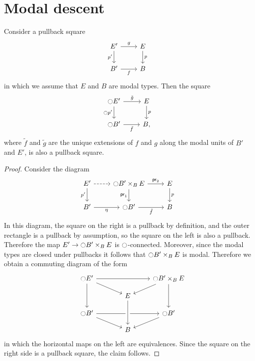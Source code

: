 \documentclass[9pt,twosided]{amsart}
\begin{document}
\section{Modal descent}\label{section:modal-descent}

\begin{prp}\label{thm:etale_flattening}
Consider a pullback square
\begin{equation*}
\begin{tikzcd}
E' \arrow[d,swap,"{p'}"] \arrow[r,"g"] & E \arrow[d,"p"] \\
B' \arrow[r,swap,"f"] & B
\end{tikzcd}
\end{equation*}
in which we assume that $E$ and $B$ are modal types. Then the square
  \begin{equation*}
    \begin{tikzcd}
      \modal E' \arrow[r,"\tilde{g}"] \arrow[d,swap,"{\modal p'}"] & E \arrow[d,"p"] \\
      \modal B' \arrow[r,swap,"\tilde{f}"] & B,
    \end{tikzcd}
  \end{equation*}
  where $\tilde{f}$ and $\tilde{g}$ are the unique extensions of $f$ and $g$ along the modal units of $B'$ and $E'$, is also a pullback square.
\end{prp}

\begin{proof}
Consider the diagram
\begin{equation*}
\begin{tikzcd}
E' \arrow[r,dashed] \arrow[d,swap,"{p'}"] & \modal B'\times_{B} E \arrow[r,"\proj 2"] \arrow[d,swap,"\proj 1"] & E \arrow[d,"p"] \\
B' \arrow[r,swap,"\modalunit"] & \modal B' \arrow[r,swap,"\tilde{f}"] & B
\end{tikzcd}
\end{equation*}
In this diagram, the square on the right is a pullback by definition, and the outer rectangle is a pullback by assumption, so the square on the left is also a pullback. Therefore the map $E'\to {\ensuremath{\ocircle}} B'\times_B E$ is ${\ocircle}$-connected. Moreover, since the modal types are closed under pullbacks it follows that ${\ocircle} B'\times_B E$ is modal. Therefore we obtain a commuting diagram of the form
\begin{equation*}
  \begin{tikzcd}[row sep=small]
    \modal E' \arrow[dd] \arrow[rr] \arrow[dr] & & \modal B'\times_B E \arrow[dd] \arrow[dl] \\
    \phantom{\modal B'\times_B E} & E \\
    \modal B' \arrow[rr] \arrow[dr] & & \modal B' \arrow[dl] \\
    & B \arrow[from=uu,crossing over]
  \end{tikzcd}
\end{equation*}
in which the horizontal maps on the left are equivalences. Since the square on the right side is a pullback square, the claim follows.
\end{proof}
\end{document}
